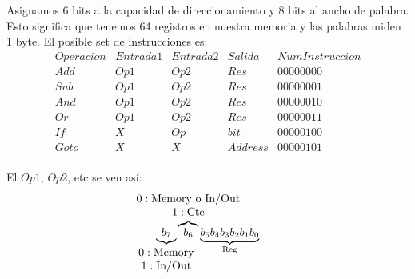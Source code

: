 \documentclass{report}
\begin{document}
Asignamos 6 bits a la capacidad de direccionamiento y 8 bits al ancho de palabra.
Esto significa que tenemos 64 registros en nuestra memoria y las palabras miden 1 byte.
\newpage
El posible set de instrucciones es:\\
\[
	\begin{array}{llll|l}
		Operacion & Entrada1 & Entrada2 & Salida  & NumInstruccion \\ \hline
		Add       & Op1      & Op2      & Res     & 00000000       \\
		Sub       & Op1      & Op2      & Res     & 00000001       \\
		And       & Op1      & Op2      & Res     & 00000010       \\
		Or        & Op1      & Op2      & Res     & 00000011       \\
		If        & X        & Op       & bit     & 00000100       \\
		Goto      & X        & X        & Address & 00000101
	\end{array}
\] \\
El \(Op1\), \(Op2\), etc se ven así: \\
\[
	\underbrace{b_7}_{\mathclap{
		\begin{array}{c}
			0: \text{Memory} \\
			1: \text{In/Out}
		\end{array}
	}
	}
	\overbrace{b_6}^{\mathclap{
		\begin{array}{c}
			0: \text{Memory o In/Out} \\
			1: \text{Cte}
		\end{array}
	}
	}
	\underbrace{b_5b_4b_3b_2b_1b_0}_{\mathclap{\text{Reg}}}
\]
\end{document}
